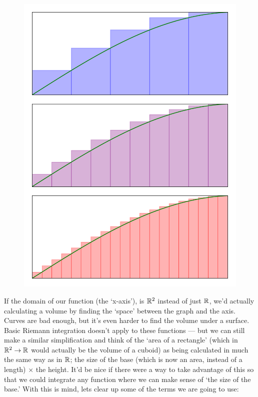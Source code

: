 \begin{figure}[H]
\begin{minipage}{.5\textwidth}
  \includegraphics{Code/Area2.png}
  \label{fig:areaabove}
\end{minipage}
\end{figure}

If the domain of our function (the `x-axis'), is $\mathbb{R}^2$ instead of just $\mathbb{R}$, we'd actually calculating a volume by finding the `space' between the graph and the axis. Curves are bad enough, but it's even harder to find the volume under a surface. Basic Riemann integration doesn't apply to these functions --- but we can still make a similar simplification and think of the `area of a rectangle' (which in $\mathbb{R}^2 \rightarrow \mathbb{R}$ would actually be the volume of a cuboid) as being calculated in much the same way as in $\mathbb{R}$; the size of the base (which is now an area, instead of a length) $\times$ the height. It'd be nice if there were a way to take advantage of this so that we could integrate any function where we can make sense of `the size of the base.' With this is mind, lets clear up some of the terms we are going to use:

